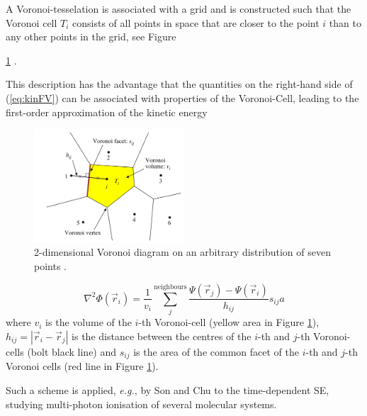 A Voronoi-tesselation is associated with a grid and is constructed such that the Voronoi cell $T_i$ consists of all points in space that are closer to the point $i$ than to any other points in the grid, see Figure {\ref{fig:VorCell} \cite{voronoi,voronoi1,voronoi2}.

This description has the advantage that the quantities on the right-hand side of (\ref{eq:kinFV}) can be associated with properties of the Voronoi-Cell, leading to the first-order approximation of the kinetic energy
\begin{figure}
   \includegraphics[width=0.5\textwidth]{Figures/VoronoiFD}
   \caption{2-dimensional Voronoi diagram on an arbitrary distribution of seven points \cite{Son_Chu}.}
   \label{fig:VorCell}
\end{figure}
\begin{equation}\label{eq:kinVoron}
   \nabla^2\Phi(\vec{r}_i)=\frac{1}{v_i} \sum_j^\text{neighbours} \frac{\Psi(\vec{r}_j)-\Psi(\vec{r}_i)}{h_{ij}} s_{ij}a
\end{equation}
where $v_i$ is the volume of the $i$-th Voronoi-cell (yellow area in Figure \ref{fig:VorCell}), $h_{ij}=|\vec{r}_i-\vec{r}_j|$ is the distance between the centres of the $i$-th and $j$-th Voronoi-cells (bolt black line) and $s_{ij}$ is the area of the common facet of the $i$-th and $j$-th Voronoi cells (red line in Figure \ref{fig:VorCell}).

Such a scheme is applied, \textit{e.g.}, by Son and Chu \cite{Son_Chu0, Son_Chu} to the time-dependent SE, studying multi-photon ionisation of several molecular systems.

}
